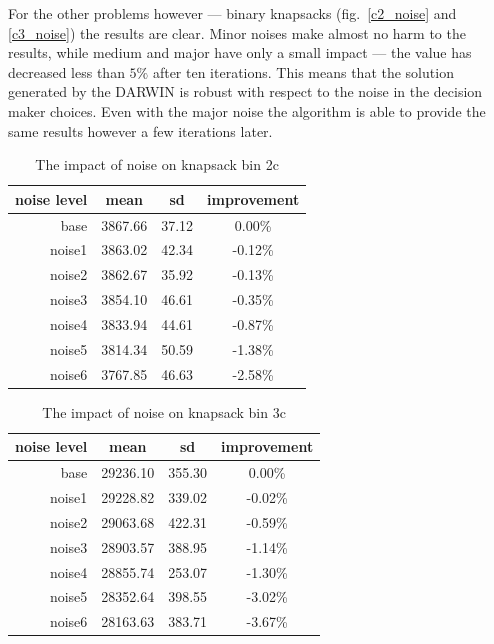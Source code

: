 For the other problems however --- binary knapsacks (fig.~\ref{c2_noise} and
\ref{c3_noise}) the results are clear. Minor noises make almost no harm to the
results, while medium and major have only a small impact --- the value has
decreased less than $5\%$ after ten iterations. This means that the solution
generated by the DARWIN is robust with respect to the noise in the decision
maker choices. Even with the major noise the algorithm is able to provide the
same results however a few iterations later.

\begin{table}[h]
  \centering
  \caption{The impact of noise on knapsack bin 2c}
  \label{t:noise1}
  \begin{tabular}{r c c c}
    \hline
    noise level & mean & sd & improvement\\
    \hline
    \hline
    base & 3867.66 & 37.12 & 0.00\% \\
    noise1 & 3863.02 & 42.34 & -0.12\% \\
    noise2 & 3862.67 & 35.92 & -0.13\% \\
    noise3 & 3854.10 & 46.61 & -0.35\% \\
    noise4 & 3833.94 & 44.61 & -0.87\% \\
    noise5 & 3814.34 & 50.59 & -1.38\% \\
    noise6 & 3767.85 & 46.63 & -2.58\% \\
    \hline
  \end{tabular}
\end{table}

\begin{table}[h]
  \centering
  \caption{The impact of noise on knapsack bin 3c}
  \label{t:noise2}
  \begin{tabular}{r c c c}
    \hline
    noise level & mean & sd & improvement\\
    \hline
    \hline
    base & 29236.10 & 355.30 & 0.00\% \\
    noise1 & 29228.82 & 339.02 & -0.02\% \\
    noise2 & 29063.68 & 422.31 & -0.59\% \\
    noise3 & 28903.57 & 388.95 & -1.14\% \\
    noise4 & 28855.74 & 253.07 & -1.30\% \\
    noise5 & 28352.64 & 398.55 & -3.02\% \\
    noise6 & 28163.63 & 383.71 & -3.67\% \\
    \hline
  \end{tabular}
\end{table}


